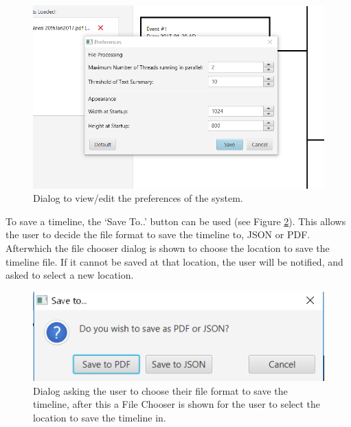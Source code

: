 \begin{figure}[H]
\caption{Dialog to view/edit the preferences of the system.}
\label{fig:preferences}
\includegraphics{preferences.PNG}
\centering
\end{figure}

\par To save a timeline, the `Save To..' button can be used (see Figure \ref{fig:saveTo}). This allows the user to decide the file format to save the timeline to, JSON or PDF. Afterwhich the file chooser dialog is shown to choose the location to save the timeline file. If it cannot be saved at that location, the user will be notified, and asked to select a new location.

\begin{figure}[H]
\caption{Dialog asking the user to choose their file format to save the timeline, after this a File Chooser is shown for the user to select the location to save the timeline in.}
\label{fig:saveTo}
\includegraphics{saveTo.PNG}
\centering
\end{figure}